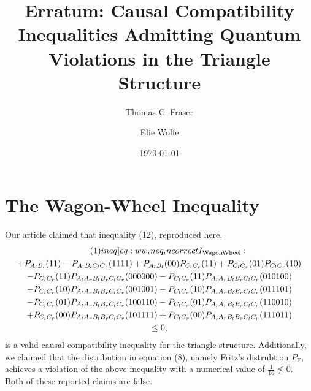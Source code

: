 \documentclass[aps, 10pt, english, twoside, pra, nofootinbib, tightenlines, longbibliography, superscriptaddress, notitlepage]{revtex4-1}
\begin{document}
    \title{Erratum: Causal Compatibility Inequalities Admitting Quantum Violations in the Triangle Structure}
    \author{Thomas C. Fraser}
    \author{Elie Wolfe}
    \date{\today}
    \maketitle
    \section{The Wagon-Wheel Inequality}
    Our article claimed that inequality (12), reproduced here,
    \begin{equation*}
    \begin{gathered}
        \eq\label[ineq]{eq:ww_ineq_incorrect}
        I\tsb{WagonWheel} : \\
        +P_{A_{l}B_{l}}(11) -P_{A_{l}B_{l}C_{l}C_{r}}(1111) +P_{A_{l}B_{l}}(00) P_{C_{l}C_{r}}(11) +P_{C_{l}C_{r}}(01) P_{C_{l}C_{r}}(10) \\
        -P_{C_{l}C_{r}}(11) P_{A_{l}A_{r}B_{l}B_{r}C_{l}C_{r}}(000000) -P_{C_{l}C_{r}}(11) P_{A_{l}A_{r}B_{l}B_{r}C_{l}C_{r}}(010100) \\
        -P_{C_{l}C_{r}}(10) P_{A_{l}A_{r}B_{l}B_{r}C_{l}C_{r}}(001001) -P_{C_{l}C_{r}}(10) P_{A_{l}A_{r}B_{l}B_{r}C_{l}C_{r}}(011101) \\
        -P_{C_{l}C_{r}}(01) P_{A_{l}A_{r}B_{l}B_{r}C_{l}C_{r}}(100110) -P_{C_{l}C_{r}}(01) P_{A_{l}A_{r}B_{l}B_{r}C_{l}C_{r}}(110010) \\
        +P_{C_{l}C_{r}}(00) P_{A_{l}A_{r}B_{l}B_{r}C_{l}C_{r}}(101111) +P_{C_{l}C_{r}}(00) P_{A_{l}A_{r}B_{l}B_{r}C_{l}C_{r}}(111011) \\
        \leq 0,
    \end{gathered}
    \end{equation*}
    is a valid causal compatibility inequality for the triangle structure. Additionally, we claimed that the distribution in equation (8), namely Fritz's distrubtion $P_{\text{F}}$, achieves a violation of the above inequality with a numerical value of $\frac{1}{16} \not\leq 0$. Both of these reported claims are false. 
\end{document}
